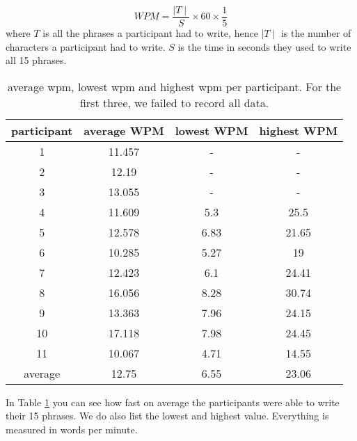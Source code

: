 \begin{equation}
    WPM = \frac{\mid T \mid}{S} \times 60 \times \frac{1}{5}
\end{equation}
where $T$ is all the phrases a participant had to write, hence $\mid T \mid$ is the number of characters a participant had to write. $S$ is the time in seconds they used to write all 15 phrases.\\

\begin{table}[ht!]
    \centering
    \caption{average wpm, lowest wpm and highest wpm per participant. For the first three, we failed to record all data.}
    \begin{tabular}{cccc} \toprule
        participant&average WPM&lowest WPM&highest WPM\\ \midrule
        1 & 11.457 & - & -\\ 
        2 & 12.19 & - & -\\
        3 & 13.055 & - & -\\ 
        4 & 11.609 & 5.3 & 25.5\\
        5 & 12.578 & 6.83 & 21.65\\
        6 & 10.285 & 5.27 & 19\\
        7 & 12.423 & 6.1 & 24.41\\
        8 & 16.056 & 8.28 & 30.74\\
        9 & 13.363 & 7.96 & 24.15\\
        10 & 17.118 & 7.98 & 24.45\\
        11 & 10.067 & 4.71 & 14.55\\
        \bottomrule
        average&12.75&6.55&23.06\\
        \bottomrule
    \end{tabular}
    \label{tab:WPM}
\end{table}

In Table \ref{tab:WPM} you can see how fast on average the participants were able to write their 15 phrases. We do also list the lowest and highest value. Everything is measured in words per minute. 

